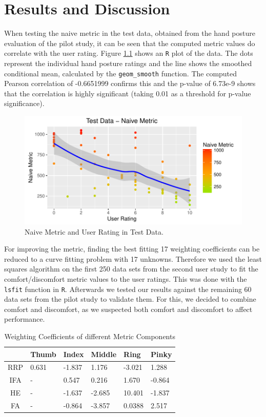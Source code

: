 \chapter{Results and Discussion}\label{chapter:results}

When testing the naive metric in the test data, obtained from the hand posture evaluation of the pilot study, it can be seen that the computed metric values do correlate with the user rating. Figure \ref{fig:testDataNaive} shows an \texttt{R} plot of the data. The dots represent the individual hand posture ratings and the line shows the smoothed conditional mean, calculated by the \texttt{geom\_smooth} function. The computed Pearson correlation of -0.6651999 confirms this and the p-value of 6.73e-9 shows that the correlation is highly significant (taking 0.01 as a threshold for p-value significance). 

\begin{figure}[h]
\includegraphics[width=\textwidth]{TestDataNaive}
\caption{Naive Metric and User Rating in Test Data.}
\label{fig:testDataNaive}
\end{figure}

For improving the metric, finding the best fitting 17 weighting coefficients can be reduced to a curve fitting problem with 17 unknowns. Therefore we used the least squares algorithm on the first 250 data sets from the second user study to fit the comfort/discomfort metric values to the user ratings. This was done with the \texttt{lsfit} function in \texttt{R}. Afterwards we tested our results against the remaining 60 data sets from the pilot study to validate them. For this, we decided to combine comfort and discomfort, as we suspected both comfort and discomfort to affect performance. 

\begin{table}
\centering
\caption{Weighting Coefficients of different Metric Components}
\label{tab:coeff}
\begin{tabular}{|c|l|l|l|l|l|} \hline
 &Thumb&Index&Middle&Ring&Pinky\\ \hline
RRP&0.631&-1.837&1.176&-3.021&1.288\\ \hline
IFA&-&0.547&0.216&1.670&-0.864\\ \hline
HE&-&-1.637&-2.685&10.401&-1.837\\ \hline
FA&-&-0.864&-3.857&0.0388&2.517\\
\hline\end{tabular}
\end{table}

